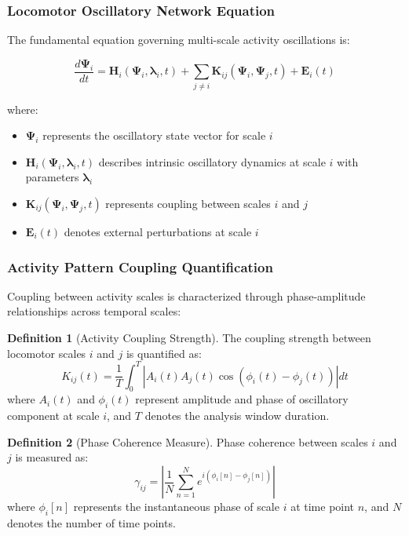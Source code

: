 \documentclass[12pt,a4paper]{article}
\theoremstyle{definition}
\newtheorem{definition}{Definition}[section]
\begin{document}
\subsubsection{Locomotor Oscillatory Network Equation}

The fundamental equation governing multi-scale activity oscillations is:

\begin{equation}
\frac{d\mathbf{\Psi}_i}{dt} = \mathbf{H}_i(\mathbf{\Psi}_i, \boldsymbol{\lambda}_i, t) + \sum_{j \neq i} \mathbf{K}_{ij}(\mathbf{\Psi}_i, \mathbf{\Psi}_j, t) + \mathbf{E}_i(t)
\label{eq:locomotor_network}
\end{equation}

where:
\begin{itemize}
\item $\mathbf{\Psi}_i$ represents the oscillatory state vector for scale $i$
\item $\mathbf{H}_i(\mathbf{\Psi}_i, \boldsymbol{\lambda}_i, t)$ describes intrinsic oscillatory dynamics at scale $i$ with parameters $\boldsymbol{\lambda}_i$
\item $\mathbf{K}_{ij}(\mathbf{\Psi}_i, \mathbf{\Psi}_j, t)$ represents coupling between scales $i$ and $j$
\item $\mathbf{E}_i(t)$ denotes external perturbations at scale $i$
\end{itemize}

\subsubsection{Activity Pattern Coupling Quantification}

Coupling between activity scales is characterized through phase-amplitude relationships across temporal scales:

\begin{definition}[Activity Coupling Strength]
The coupling strength between locomotor scales $i$ and $j$ is quantified as:
\begin{equation}
K_{ij}(t) = \frac{1}{T} \int_0^T \left| A_i(t) A_j(t) \cos(\phi_i(t) - \phi_j(t)) \right| dt
\label{eq:activity_coupling}
\end{equation}
where $A_i(t)$ and $\phi_i(t)$ represent amplitude and phase of oscillatory component at scale $i$, and $T$ denotes the analysis window duration.
\end{definition}

\begin{definition}[Phase Coherence Measure]
Phase coherence between scales $i$ and $j$ is measured as:
\begin{equation}
\gamma_{ij} = \left| \frac{1}{N} \sum_{n=1}^{N} e^{i(\phi_i[n] - \phi_j[n])} \right|
\end{equation}
where $\phi_i[n]$ represents the instantaneous phase of scale $i$ at time point $n$, and $N$ denotes the number of time points.
\end{definition}
\end{document}

